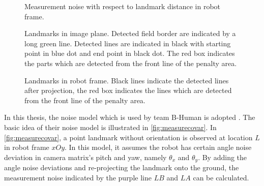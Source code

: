 \begin{figure}[h!]
  \centering

\caption{Measurement noise with respect to landmark distance in robot frame.}
  \label{fig:measnoise}
\end{figure}



\begin{figure}[h!]
  \centering
{}
\caption[Landmarks in image plane.]{Landmarks in image plane. Detected field border are indicated by a long green line. Detected lines are indicated in black with starting point in blue dot and end point in black dot. The red box indicates the parts which are detected from the front line of the penalty area.}
  \label{fig:landmarkImagePlane}
\end{figure}


\begin{figure}[h!]
  \centering
{}
\caption[Landmarks in robot frame.]{Landmarks in robot frame. Black lines indicate the detected lines after projection, the red box indicates the lines which are detected from the front line of the penalty area.}
  \label{fig:landmarkRobotFrame}
\end{figure}

In this thesis, the noise model which is used by team B-Human is adopted \cite{Bhuman}. The basic idea of their noise model is illustrated in \autoref{fig:measurecovar}. In \autoref{fig:measurecovar}, a point landmark without orientation is observed at location $L$ in robot frame $xOy$. In this model, it assumes the robot has certain angle noise deviation in camera matrix's pitch and yaw, namely $\theta_{x}$ and $\theta_{y}$. By adding the angle noise deviations and re-projecting the landmark onto the ground, the measurement noise indicated by the purple line $LB$ and $LA$ can be calculated. 


